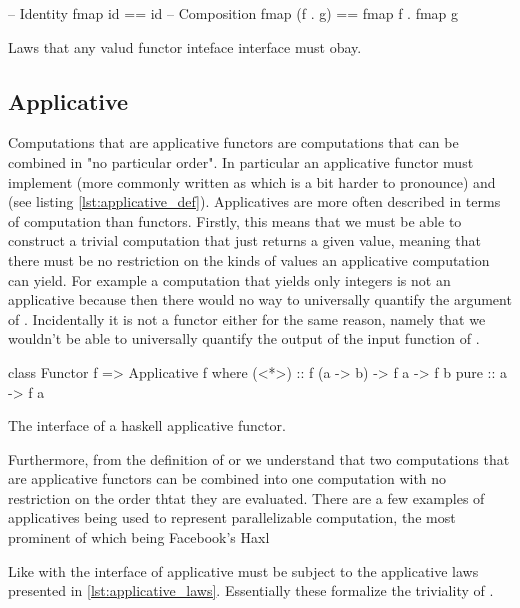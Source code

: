 \begin{code}
\begin{haskellcode}
-- Identity
fmap id == id
-- Composition
fmap (f . g) == fmap f . fmap g
\end{haskellcode}
\caption{\label{lst:functor_laws}Laws that any valud functor inteface interface must obay.}
\end{code}


\subsection{Applicative}

Computations that are applicative
\cite{mcbrideApplicativeProgrammingEffects2008} functors are
computations that can be combined in "no particular order". In
particular an applicative functor must implement  (more commonly written as \hask{<*>} which is a
bit harder to pronounce) and  (see listing
\ref{lst:applicative_def}). Applicatives are more often described in
terms of computation than functors. Firstly, this means that we must
be able to construct a trivial computation that just returns a given
value, meaning that there must be no restriction on the kinds of
values an applicative computation can yield. For example a computation
that yields only integers is not an applicative because then there
would no way to universally quantify the argument of
. Incidentally it is not a functor either for the same
reason, namely that we wouldn't be able to universally quantify the
output of the input function of .

\begin{code}
\begin{haskellcode}
class Functor f => Applicative f  where
  (<*>) :: f (a -> b) -> f a -> f b
  pure :: a -> f a
\end{haskellcode}
\caption{\label{lst:applicative_def}The interface of a haskell applicative functor.}
\end{code}

Furthermore, from the definition of  or \hask{<*>} we
understand that two computations that are applicative functors can be
combined into one computation with no restriction on the order thtat
they are evaluated. There are a few examples of applicatives being
used to represent parallelizable computation, the most prominent of
which being Facebook's Haxl \cite{marlowHaxlProjectFacebook2013}

Like with  the interface of applicative must be subject
to the applicative laws presented in
\ref{lst:applicative_laws}. Essentially these formalize the triviality
of .

